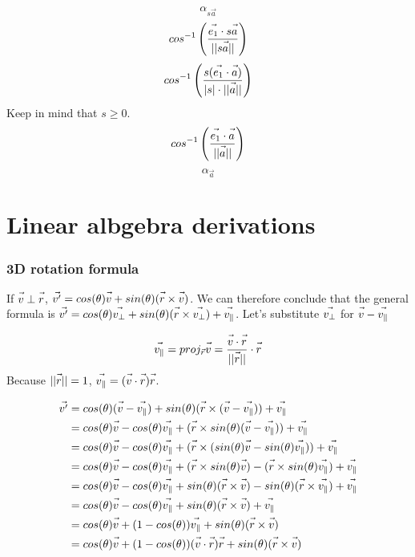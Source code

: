 \documentclass{article}
\newcommand{\fvec}[1]{\vec{\vphantom{A}#1}}
\begin{document}
$$ \alpha_{s\vec{a}} $$
$$ cos^{-1}\left(\frac{\fvec{e_1} \cdot s\fvec{a}}{||s\fvec{a}||}\right) $$
$$ cos^{-1}\left(\frac{s(\fvec{e_1} \cdot \fvec{a})}{|s| \cdot ||\fvec{a}||}\right) $$
Keep in mind that $ s \ge 0 $.
$$ cos^{-1}\left(\frac{\fvec{e_1} \cdot \fvec{a}}{||\fvec{a}||}\right) $$
$$ \alpha_{\vec{a}} $$

\section{Linear albgebra derivations}
\subsubsection{3D rotation formula}
If $ \fvec{v} \perp \fvec{r} $, $ \fvec{v^{\prime}} = cos(\theta) \fvec{v} + sin(\theta)(\fvec{r} \times \fvec{v}) $. We can therefore conclude that the general formula is $ \fvec{v^{\prime}} = cos(\theta) \fvec{v_{\perp}} + sin(\theta)(\fvec{r} \times \fvec{v_{\perp}}) + \fvec{v_{\parallel}} $. Let's substitute $ \fvec{v_{\perp}} $ for $ \fvec{v} - \fvec{v_{\parallel}} $

$$ \fvec{v_{\parallel}} = proj_{\vec{r}} \fvec{v} = \frac{\fvec{v} \cdot \fvec{r}}{||\fvec{r}||} \cdot \fvec{r} $$
Because $ ||\fvec{r}|| = 1 $, $ \fvec{v_{\parallel}} = (\fvec{v} \cdot \fvec{r}) \fvec{r} $.

\begin{equation}
\begin{split}
\fvec{v^{\prime}} & = cos(\theta)(\fvec{v} - \fvec{v_{\parallel}}) + sin(\theta)(\fvec{r} \times (\fvec{v} - \fvec{v_{\parallel}})) + \fvec{v_{\parallel}} \\
& = cos(\theta) \fvec{v} - cos(\theta) \fvec{v_{\parallel}} + (\fvec{r} \times sin(\theta) (\fvec{v} - \fvec{v_{\parallel}})) + \fvec{v_{\parallel}} \\
& = cos(\theta) \fvec{v} - cos(\theta) \fvec{v_{\parallel}} + (\fvec{r} \times (sin(\theta) \fvec{v} - sin(\theta) \fvec{v_{\parallel}})) + \fvec{v_{\parallel}} \\
& = cos(\theta) \fvec{v} - cos(\theta) \fvec{v_{\parallel}} + (\fvec{r} \times sin(\theta) \fvec{v}) - (\fvec{r} \times sin(\theta) \fvec{v_{\parallel}}) + \fvec{v_{\parallel}} \\
& = cos(\theta) \fvec{v} - cos(\theta) \fvec{v_{\parallel}} + sin(\theta) (\fvec{r} \times \fvec{v}) - sin(\theta) (\fvec{r} \times \fvec{v_{\parallel}}) + \fvec{v_{\parallel}} \\
& = cos(\theta) \fvec{v} - cos(\theta) \fvec{v_{\parallel}} + sin(\theta) (\fvec{r} \times \fvec{v}) + \fvec{v_{\parallel}} \\
& = cos(\theta) \fvec{v} + (1 - cos(\theta))\fvec{v_{\parallel}} + sin(\theta) (\fvec{r} \times \fvec{v}) \\
& = cos(\theta) \fvec{v} + (1 - cos(\theta))(\fvec{v} \cdot \fvec{r}) \fvec{r} + sin(\theta) (\fvec{r} \times \fvec{v})
\end{split}
\end{equation}
\end{document}
